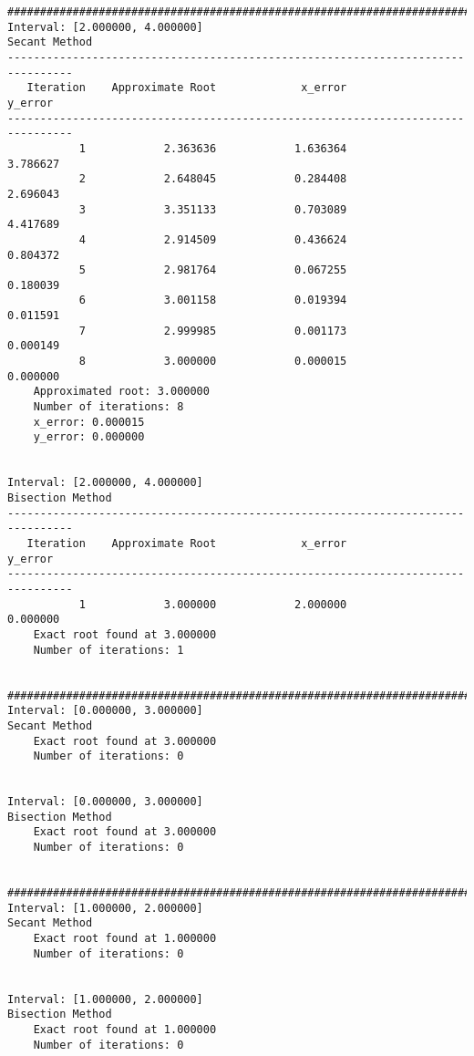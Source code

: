 \documentclass[letterpaper,10pt,titlepage]{article}
\begin{document}
\begin{verbatim}
####################################################################################################
Interval: [2.000000, 4.000000]
Secant Method
--------------------------------------------------------------------------------
   Iteration    Approximate Root             x_error             y_error
--------------------------------------------------------------------------------
           1            2.363636            1.636364            3.786627
           2            2.648045            0.284408            2.696043
           3            3.351133            0.703089            4.417689
           4            2.914509            0.436624            0.804372
           5            2.981764            0.067255            0.180039
           6            3.001158            0.019394            0.011591
           7            2.999985            0.001173            0.000149
           8            3.000000            0.000015            0.000000
	Approximated root: 3.000000
	Number of iterations: 8
	x_error: 0.000015
	y_error: 0.000000


Interval: [2.000000, 4.000000]
Bisection Method
--------------------------------------------------------------------------------
   Iteration    Approximate Root             x_error             y_error
--------------------------------------------------------------------------------
           1            3.000000            2.000000            0.000000
	Exact root found at 3.000000
	Number of iterations: 1


####################################################################################################
Interval: [0.000000, 3.000000]
Secant Method
	Exact root found at 3.000000
	Number of iterations: 0


Interval: [0.000000, 3.000000]
Bisection Method
	Exact root found at 3.000000
	Number of iterations: 0


####################################################################################################
Interval: [1.000000, 2.000000]
Secant Method
	Exact root found at 1.000000
	Number of iterations: 0


Interval: [1.000000, 2.000000]
Bisection Method
	Exact root found at 1.000000
	Number of iterations: 0



\end{verbatim}
\end{document}
